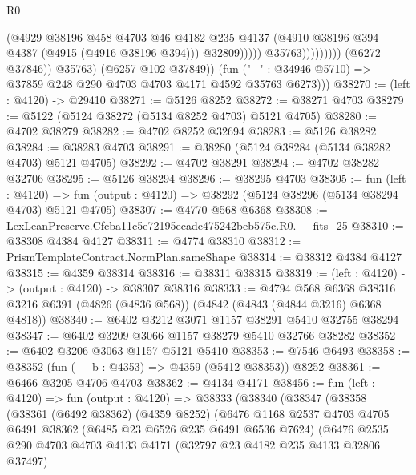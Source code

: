 \begin{lexlean}{R0}
\begin{coremodule}
                                        (@4929
                                          @38196
                                          @458
                                          @4703
                                          @46
                                          @4182
                                          @235
                                          @4137
                                          (@4910 @38196 @394 @4387 (@4915 (@4916 @38196 @394)))
                                          @32809)))))
                                @35763)))))))))
              (@6272 @37846))
            @35763)
          (@6257 @102 @37849))
        (fun ("_" : @34946 @5710) => @37859 @248 @290 @4703 @4703 @4171 @4592 @35763 @6273)))
@38270 := (left : @4120) -> @29410
@38271 := @5126 @8252
@38272 := @38271 @4703
@38279 := @5122 (@5124 @38272 (@5134 @8252 @4703) @5121 @4705)
@38280 := @4702 @38279
@38282 := @4702 @8252 @32694
@38283 := @5126 @38282
@38284 := @38283 @4703
@38291 := @38280 (@5124 @38284 (@5134 @38282 @4703) @5121 @4705)
@38292 := @4702 @38291
@38294 := @4702 @38282 @32706
@38295 := @5126 @38294
@38296 := @38295 @4703
@38305 := fun (left : @4120) =>
  fun (output : @4120) => @38292 (@5124 @38296 (@5134 @38294 @4703) @5121 @4705)
@38307 := @4770 @568 @6368
@38308 := LexLeanPreserve.Cfcba11c5e72195ecadc475242beb575c.R0.__fits_25
@38310 := @38308 @4384 @4127
@38311 := @4774 @38310
@38312 := PrismTemplateContract.NormPlan.sameShape
@38314 := @38312 @4384 @4127
@38315 := @4359 @38314
@38316 := @38311 @38315
@38319 := (left : @4120) -> (output : @4120) -> @38307 @38316
@38333 := @4794
    @568
    @6368
    @38316
    @3216
    @6391
    (@4826 (@4836 @568))
    (@4842 (@4843 (@4844 @3216) @6368 @4818))
@38340 := @6402 @3212 @3071 @1157 @38291 @5410 @32755 @38294
@38347 := @6402 @3209 @3066 @1157 @38279 @5410 @32766 @38282
@38352 := @6402 @3206 @3063 @1157 @5121 @5410
@38353 := @7546 @6493
@38358 := @38352 (fun (__b : @4353) => @4359 (@5412 @38353)) @8252
@38361 := @6466 @3205 @4706 @4703
@38362 := @4134 @4171
@38456 := fun (left : @4120) =>
  fun (output : @4120) =>
  @38333
    (@38340
      (@38347
        (@38358
          (@38361
            (@6492 @38362)
            (@4359 @8252)
            (@6476
              @1168
              @2537
              @4703
              @4705
              @6491
              @38362
              (@6485 @23 @6526 @235 @6491 @6536 @7624)
              (@6476
                @2535
                @290
                @4703
                @4703
                @4133
                @4171
                (@32797 @23 @4182 @235 @4133 @32806 @37497)

\end{coremodule}
\end{lexlean}
